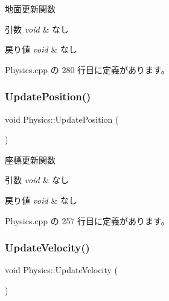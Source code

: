 地面更新関数 


\begin{DoxyParams}{引数}
{\em void} & なし \\
\hline
\end{DoxyParams}

\begin{DoxyRetVals}{戻り値}
{\em void} & なし \\
\hline
\end{DoxyRetVals}


 Physics.\+cpp の 280 行目に定義があります。

\mbox{\label{class_physics_a481f06d777c1b1f52dc2c06c71e93932}} 
\subsubsection{\texorpdfstring{Update\+Position()}{UpdatePosition()}}
{\footnotesize\ttfamily void Physics\+::\+Update\+Position (\begin{DoxyParamCaption}{ }\end{DoxyParamCaption})\hspace{0.3cm}{\ttfamily [private]}}



座標更新関数 


\begin{DoxyParams}{引数}
{\em void} & なし \\
\hline
\end{DoxyParams}

\begin{DoxyRetVals}{戻り値}
{\em void} & なし \\
\hline
\end{DoxyRetVals}


 Physics.\+cpp の 257 行目に定義があります。

\mbox{\label{class_physics_abd74d6413b1fd6c77007edf51ea9db4b}} 
\subsubsection{\texorpdfstring{Update\+Velocity()}{UpdateVelocity()}}
{\footnotesize\ttfamily void Physics\+::\+Update\+Velocity (\begin{DoxyParamCaption}{ }\end{DoxyParamCaption})\hspace{0.3cm}{\ttfamily [private]}}



